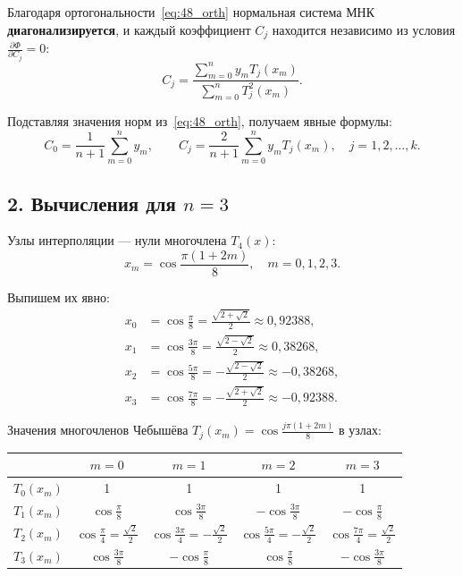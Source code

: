 \documentclass{article}
\begin{document}
Благодаря ортогональности~\eqref{eq:48_orth} нормальная система МНК \textbf{диагонализируется}, и каждый коэффициент $C_j$ находится независимо из условия $\frac{\partial \Phi}{\partial C_j} = 0$:
\begin{equation}
C_j = \frac{\displaystyle\sum_{m=0}^{n} y_m T_j(x_m)}{\displaystyle\sum_{m=0}^{n} T_j^2(x_m)}.
\label{eq:48_cj}
\end{equation}

Подставляя значения норм из~\eqref{eq:48_orth}, получаем явные формулы:
\begin{equation}
C_0 = \frac{1}{n+1} \sum_{m=0}^{n} y_m, \qquad C_j = \frac{2}{n+1} \sum_{m=0}^{n} y_m T_j(x_m), \quad j = 1, 2, \ldots, k.
\label{eq:48_cj_expl}
\end{equation}

\subsection*{2. Вычисления для $n = 3$}

Узлы интерполяции --- нули многочлена $T_4(x)$:
\begin{equation}
x_m = \cos\frac{\pi(1+2m)}{8}, \quad m = 0, 1, 2, 3.
\end{equation}

Выпишем их явно:
\begin{align}
x_0 &= \cos\frac{\pi}{8} = \frac{\sqrt{2+\sqrt{2}}}{2} \approx 0{,}92388, \\
x_1 &= \cos\frac{3\pi}{8} = \frac{\sqrt{2-\sqrt{2}}}{2} \approx 0{,}38268, \\
x_2 &= \cos\frac{5\pi}{8} = -\frac{\sqrt{2-\sqrt{2}}}{2} \approx -0{,}38268, \\
x_3 &= \cos\frac{7\pi}{8} = -\frac{\sqrt{2+\sqrt{2}}}{2} \approx -0{,}92388.
\end{align}

Значения многочленов Чебышёва $T_j(x_m) = \cos\frac{j\pi(1+2m)}{8}$ в узлах:

\begin{center}
\begin{tabular}{|c|c|c|c|c|}
\hline
 & $m=0$ & $m=1$ & $m=2$ & $m=3$ \\
\hline
$T_0(x_m)$ & 1 & 1 & 1 & 1 \\
\hline
$T_1(x_m)$ & $\cos\frac{\pi}{8}$ & $\cos\frac{3\pi}{8}$ & $-\cos\frac{3\pi}{8}$ & $-\cos\frac{\pi}{8}$ \\
\hline
$T_2(x_m)$ & $\cos\frac{\pi}{4} = \frac{\sqrt{2}}{2}$ & $\cos\frac{3\pi}{4} = -\frac{\sqrt{2}}{2}$ & $\cos\frac{5\pi}{4} = -\frac{\sqrt{2}}{2}$ & $\cos\frac{7\pi}{4} = \frac{\sqrt{2}}{2}$ \\
\hline
$T_3(x_m)$ & $\cos\frac{3\pi}{8}$ & $-\cos\frac{\pi}{8}$ & $\cos\frac{\pi}{8}$ & $-\cos\frac{3\pi}{8}$ \\
\hline
\end{tabular}
\end{center}
\end{document}
